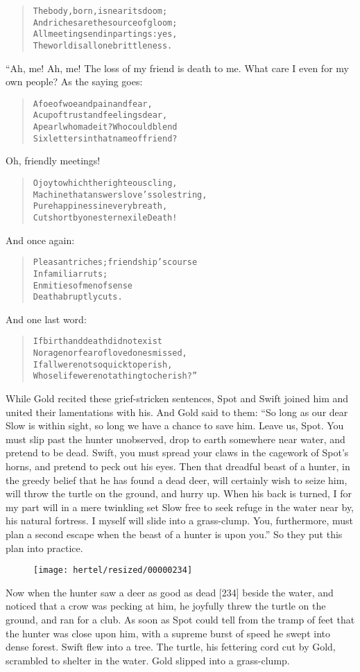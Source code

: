 \documentclass[article, twoside, 10pt]{memoir}
\renewenvironment{verbatim}{%
\begin{quote}%
\vskip -10pt%
\begin{alltt}\normalfont\small}{\end{alltt}%
\end{quote}%
\vskip -10pt
} %
\begin{document}
\begin{verbatim}
The body, born, is near its doom;
And riches are the source of gloom;
All meetings end in partings: yes,
The world is all one brittleness.
\end{verbatim}
“Ah, me! Ah, me! The loss of my friend is death to me. What care I
even for my own people? As the saying goes:

\begin{verbatim}
A foe of woe and pain and fear,
A cup of trust and feelings dear,
A pearl{\textemdash}who made it? Who could blend
Six letters in that name of friend?
\end{verbatim}
Oh, friendly meetings!

\begin{verbatim}
O joy to which the righteous cling,
Machine that answers love's sole string,
Pure happiness in every breath,
Cut short by one stern exile{\textemdash}Death!
\end{verbatim}
And once again:

\begin{verbatim}
Pleasant riches; friendship's course
    In familiar ruts;
Enmities of men of sense{\textemdash}
    Death abruptly cuts.
\end{verbatim}
And one last word:

\begin{verbatim}
If birth and death did not exist
Nor age nor fear of loved ones missed,
If all were not so quick to perish,
Whose life were not a thing to cherish?”
\end{verbatim}
While Gold recited these grief-stricken sentences, Spot and Swift
joined him and united their lamentations with his. And Gold said to
them:
``So long as our dear Slow is within sight, so long we have a chance to save him. Leave us, Spot. You must slip past the hunter unobserved, drop to earth somewhere near water, and pretend to be dead. Swift, you must spread your claws in the cagework of Spot's horns, and pretend to peck out his eyes. Then that dreadful beast of a hunter, in the greedy belief that he has found a dead deer, will certainly wish to seize him, will throw the turtle on the ground, and hurry up. When his back is turned, I for my part will in a mere twinkling set Slow free to seek refuge in the water near by, his natural fortress. I myself will slide into a grass-clump. You, furthermore, must plan a second escape when the beast of a hunter is upon you.''
So they put this plan into practice.

\begin{figure}[p]\texttt{[image: hertel/resized/00000234]}\end{figure}Now when the hunter saw a deer as good as dead [234] beside the
water, and noticed that a crow was pecking at him, he joyfully
threw the turtle on the ground, and ran for a club. As soon as Spot
could tell from the tramp of feet that the hunter was close upon
him, with a supreme burst of speed he swept into dense forest.
Swift flew into a tree. The turtle, his fettering cord cut by Gold,
scrambled to shelter in the water. Gold slipped into a
grass-clump.
\end{document}
